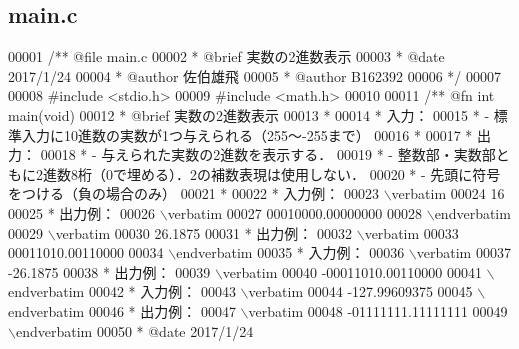 \subsection{main.\-c}

\begin{DoxyCode}
00001 \textcolor{comment}{/**  @file main.c}
00002 \textcolor{comment}{ *   @brief  実数の2進数表示}
00003 \textcolor{comment}{ *   @date   2017/1/24}
00004 \textcolor{comment}{ *   @author 佐伯雄飛}
00005 \textcolor{comment}{ *   @author B162392}
00006 \textcolor{comment}{ */}
00007 
00008 \textcolor{preprocessor}{#include <stdio.h>}
00009 \textcolor{preprocessor}{#include <math.h>}
00010 \textcolor{comment}{}
00011 \textcolor{comment}{/** @fn int main(void)}
00012 \textcolor{comment}{ *  @brief  実数の2進数表示}
00013 \textcolor{comment}{ *}
00014 \textcolor{comment}{ *  入力：}
00015 \textcolor{comment}{ *  - 標準入力に10進数の実数が1つ与えられる（255〜-255まで）}
00016 \textcolor{comment}{ *}
00017 \textcolor{comment}{ *  出力：}
00018 \textcolor{comment}{ *  - 与えられた実数の2進数を表示する．}
00019 \textcolor{comment}{ *  - 整数部・実数部ともに2進数8桁（0で埋める）．2の補数表現は使用しない．}
00020 \textcolor{comment}{ *  - 先頭に符号をつける（負の場合のみ）}
00021 \textcolor{comment}{ *}
00022 \textcolor{comment}{ *  入力例：}
00023 \textcolor{comment}{\(\backslash\)verbatim}
00024 \textcolor{comment}{16}
00025 \textcolor{comment}{  *  出力例：}
00026 \textcolor{comment}{\(\backslash\)verbatim}
00027 \textcolor{comment}{00010000.00000000}
00028 \textcolor{comment}{\(\backslash\)endverbatim}
00029 \textcolor{comment}{\(\backslash\)verbatim}
00030 \textcolor{comment}{26.1875}
00031 \textcolor{comment}{  *  出力例：}
00032 \textcolor{comment}{\(\backslash\)verbatim}
00033 \textcolor{comment}{00011010.00110000}
00034 \textcolor{comment}{\(\backslash\)endverbatim}
00035 \textcolor{comment}{ *  入力例：}
00036 \textcolor{comment}{\(\backslash\)verbatim}
00037 \textcolor{comment}{-26.1875}
00038 \textcolor{comment}{  *  出力例：}
00039 \textcolor{comment}{\(\backslash\)verbatim}
00040 \textcolor{comment}{-00011010.00110000}
00041 \textcolor{comment}{\(\backslash\)endverbatim}
00042 \textcolor{comment}{  *  入力例：}
00043 \textcolor{comment}{\(\backslash\)verbatim}
00044 \textcolor{comment}{-127.99609375}
00045 \textcolor{comment}{\(\backslash\)endverbatim}
00046 \textcolor{comment}{  *  出力例：}
00047 \textcolor{comment}{\(\backslash\)verbatim}
00048 \textcolor{comment}{-01111111.11111111}
00049 \textcolor{comment}{\(\backslash\)endverbatim}
00050 \textcolor{comment}{ *  @date   2017/1/24}

\end{DoxyCode}
